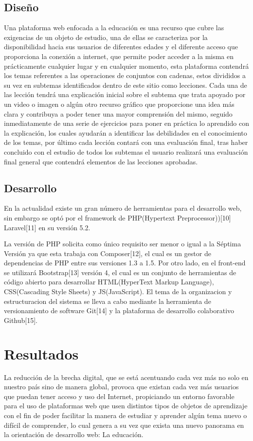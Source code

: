 \documentclass{llncs}
\begin{document}
\subsection{Diseño}
Una plataforma web enfocada a la educación es una recurso que cubre las exigencias de un objeto de estudio, una de ellas se caracteriza por la disponibilidad hacia sus usuarios de diferentes edades y el diferente acceso que proporciona la conexión a internet, que permite poder acceder a la misma en prácticamente cualquier lugar y en cualquier momento, esta plataforma contendrá los temas referentes a las operaciones de conjuntos con cadenas, estos divididos a su vez en subtemas identificados dentro de este sitio como lecciones. Cada una de las lección tendrá una explicación inicial sobre el subtema que trata apoyado por un video o imagen o algún otro recurso gráfico que proporcione una idea más clara y contribuya a poder tener una mayor comprensión del mismo, seguido inmediatamente de una serie de ejercicios para poner en práctica lo aprendido con la explicación, los cuales ayudarán a identificar las debilidades en el conocimiento de los temas, por último cada lección contará con una evaluación final, tras haber concluido con el estudio de todos los subtemas el usuario realizará una evaluación final general que contendrá elementos de las lecciones aprobadas.


\subsection{Desarrollo}
En la actualidad existe un gran número de herramientas para el desarrollo web, sin embargo se optó por el framework de PHP(Hypertext Preprocessor))[10] Laravel[11] en su versión 5.2. 

La versión de PHP solicita como único requisito ser menor o igual a la Séptima Versión ya que esta trabaja con Composer[12], el cual es un gestor de dependencias de PHP entre sus versiones 1.3 a 1.5. Por otro lado, en el front-end se utilizará Bootstrap[13] versión 4, el cual es un conjunto de herramientas de código abierto para desarrollar HTML(HyperText Markup Language), CSS(Cascading Style Sheets) y JS(JavaScript). El tema de la organizacion y estructuracion del sistema se lleva a cabo mediante la herramienta de versionamiento de software Git[14] y la plataforma de desarrollo colaborativo Github[15].


%
\section{Resultados}
La reducción de la brecha digital, que se está acentuando cada vez más no solo en nuestro país sino de manera global, provoca que existan cada vez más usuarios que puedan tener acceso y uso del Internet, propiciando un entorno favorable para el uso de plataformas web que usen distintos tipos de objetos de aprendizaje con el fin de poder facilitar la manera de estudiar y aprender algún tema nuevo o difícil de comprender, lo cual genera a su vez que exista una nuevo panorama en la orientación de desarrollo web: La educación.
\end{document}
